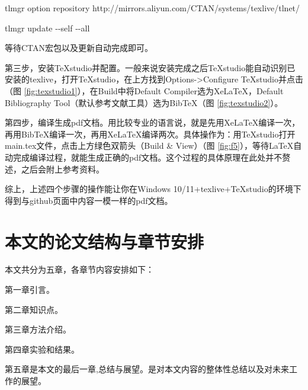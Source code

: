 \noindent tlmgr option repository http://mirrors.aliyun.com/CTAN/systems/texlive/tlnet/

\noindent tlmgr update $ \text{-}\text{-} $self $ \text{-}\text{-} $all

\noindent 等待CTAN宏包以及更新自动完成即可。


第三步，安装TeXstudio并配置。一般来说安装完成之后TeXstudio能自动识别已安装的texlive，打开TeXstudio，在上方找到Options->Configure TeXstudio并点击（图 \ref{fig:texstudio1}），在Build中将Default Compiler选为XeLaTeX，Default Bibliography Tool（默认参考文献工具）选为BibTeX（图 \ref{fig:texstudio2}）。



第四步，编译生成pdf文档。用比较专业的语言说，就是先用XeLaTeX编译一次，再用BibTeX编译一次，再用XeLaTeX编译两次。具体操作为：用TeXstudio打开main.tex文件，点击上方绿色双箭头（Build \& View）（图 \ref{fig:f5}），等待LaTeX自动完成编译过程，就能生成正确的pdf文档。这个过程的具体原理在此处并不赘述，之后会附上参考资料。


综上，上述四个步骤的操作能让你在Windows 10/11+texlive+TeXstudio的环境下得到与github页面中内容一模一样的pdf文档。

\section{本文的论文结构与章节安排}
\label{sec:arrangement}
本文共分为五章，各章节内容安排如下：

第一章引言。

第二章知识点。

第三章方法介绍。

第四章实验和结果。

第五章是本文的最后一章,总结与展望。是对本文内容的整体性总结以及对未来工作的展望。


